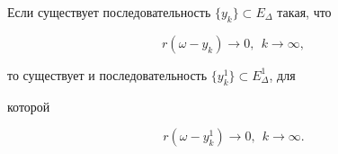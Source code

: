 \begin{lems} 


Если существует последовательность $\{y_k\}\subset E_\Delta$ такая, что 


\begin{equation} 


r(\omega-y_k)\to0,\ \ k\to\infty, 


\end{equation} 


то существует и последовательность $\{y^1_k\}\subset E^1_\Delta$, для 


которой 


\begin{equation} 


r(\omega-y^1_k)\to0,\ \ k\to\infty. 


\end{equation} 


\end{lems} 


 


